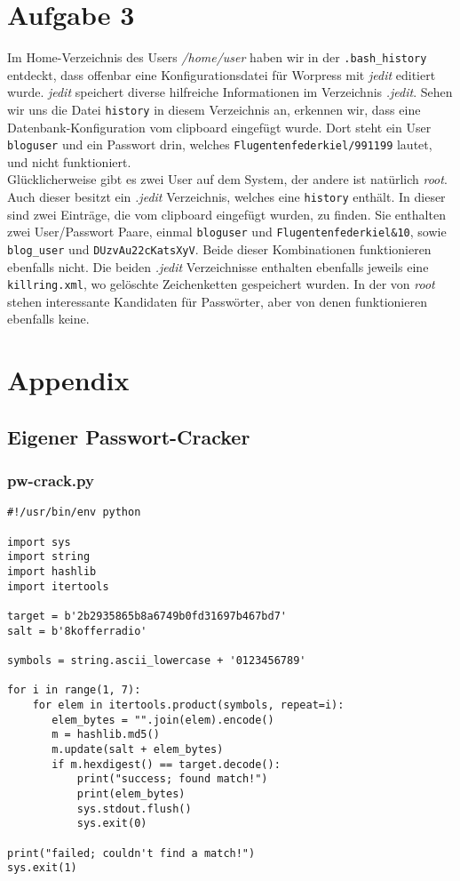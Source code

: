 \documentclass[10pt,a4paper]{article}
\begin{document}
\setcounter{section}{3}
\setcounter{subsection}{0}
\section*{Aufgabe 3}
Im Home-Verzeichnis des Users \textit{/home/user} haben wir in der \texttt{.bash\_history} entdeckt, dass offenbar eine Konfigurationsdatei für Worpress mit \textit{jedit} editiert wurde. \textit{jedit} speichert diverse hilfreiche Informationen im Verzeichnis \textit{.jedit}. Sehen wir uns die Datei \texttt{history} in diesem Verzeichnis an, erkennen wir, dass eine Datenbank-Konfiguration vom clipboard eingefügt wurde. Dort steht ein User \texttt{bloguser} und ein Passwort drin, welches \texttt{Flugentenfederkiel/991199} lautet, und nicht funktioniert. \\
Glücklicherweise gibt es zwei User auf dem System, der andere ist natürlich \textit{root}. Auch dieser besitzt ein \textit{.jedit} Verzeichnis, welches eine \texttt{history} enthält. In dieser sind zwei Einträge, die vom clipboard eingefügt wurden, zu finden. Sie enthalten zwei User/Passwort Paare, einmal \texttt{bloguser} und \texttt{Flugentenfederkiel\&10}, sowie \texttt{blog\_user} und \texttt{DUzvAu22cKatsXyV}. Beide dieser Kombinationen funktionieren ebenfalls nicht. Die beiden \textit{.jedit} Verzeichnisse enthalten ebenfalls jeweils eine \texttt{killring.xml}, wo gelöschte Zeichenketten gespeichert wurden. In der von \textit{root} stehen interessante Kandidaten für Passwörter, aber von denen funktionieren ebenfalls keine.


\newpage
\section*{Appendix}
\subsection*{Eigener Passwort-Cracker}
\subsubsection*{pw-crack.py}
\begin{verbatim}
#!/usr/bin/env python

import sys
import string
import hashlib
import itertools

target = b'2b2935865b8a6749b0fd31697b467bd7'
salt = b'8kofferradio'

symbols = string.ascii_lowercase + '0123456789'

for i in range(1, 7):
    for elem in itertools.product(symbols, repeat=i):
       elem_bytes = "".join(elem).encode()
       m = hashlib.md5()
       m.update(salt + elem_bytes)
       if m.hexdigest() == target.decode():
           print("success; found match!")
           print(elem_bytes)
           sys.stdout.flush()
           sys.exit(0)

print("failed; couldn't find a match!")
sys.exit(1)

\end{verbatim}
\end{document}

